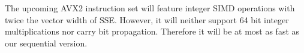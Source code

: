 \documentclass[oribibl,a4paper]{llncs2e/llncs}
\begin{document}
The upcoming AVX2 instruction set will feature integer SIMD operations with twice the vector width of SSE.
However, it will neither support 64 bit integer multiplications nor carry bit propagation.
Therefore it will be at most as fast as our sequential version.

\end{document}
